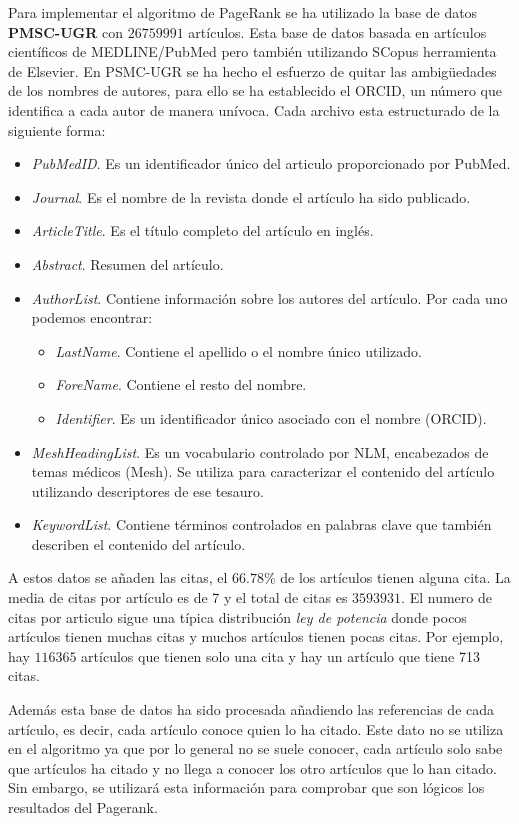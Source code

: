\documentclass[size=a4, parskip=half, titlepage=false, toc=flat, toc=bib, 12pt]{scrartcl}
\theoremstyle{theorem-style}
\theoremstyle{definition-style}
\theoremstyle{remark-style}
\theoremstyle{example-style}
\theoremstyle{definition-style}
\theoremstyle{remark-style}
\begin{document}
Para implementar el algoritmo de PageRank se ha utilizado la base de datos \textbf{PMSC-UGR} con
$26759991$ artículos. Esta base de datos basada en artículos científicos de MEDLINE/PubMed  pero
también utilizando SCopus herramienta de Elsevier. En PSMC-UGR se ha hecho el esfuerzo de
quitar las ambigüedades de los nombres de autores, para ello se ha establecido el ORCID, un número
que identifica a cada autor de manera unívoca. Cada archivo esta estructurado de la siguiente forma:
\begin{itemize}
\item \textit{PubMedID}. Es un identificador único del articulo proporcionado por PubMed.
\item \textit{Journal}. Es el nombre de la revista donde el artículo ha sido publicado.
\item \textit{ArticleTitle}. Es el título completo del artículo en inglés.
\item \textit{Abstract}. Resumen del artículo.
\item \textit{AuthorList}. Contiene información sobre los autores del artículo. Por cada uno podemos encontrar:
\begin{itemize}
\item \textit{LastName}. Contiene el apellido o el nombre único utilizado.
\item \textit{ForeName}. Contiene el resto del nombre.
\item \textit{Identifier}. Es un identificador único asociado con el nombre (ORCID).
\end{itemize}
\item \textit{MeshHeadingList}. Es un vocabulario controlado por NLM, encabezados de temas médicos (Mesh). Se utiliza para caracterizar el contenido del artículo utilizando descriptores de ese tesauro.
\item \textit{KeywordList}. Contiene términos controlados en palabras clave que también describen el contenido del artículo.
\end{itemize}

A estos datos se añaden las citas, el $66.78 \%$ de los artículos tienen alguna cita. La media de citas por artículo es de 7 y el total de citas es $3593931$. El numero de citas por articulo sigue una típica distribución \textit{ley de potencia} donde pocos artículos tienen muchas citas y muchos artículos tienen pocas citas. Por ejemplo, hay $116365$ artículos que tienen solo una cita y hay un artículo que tiene 713 citas.

Además esta base de datos ha sido procesada añadiendo las referencias de cada artículo, es decir, cada artículo conoce quien lo ha citado. Este dato no se utiliza en el algoritmo ya que por lo general no se suele conocer, cada artículo solo sabe que artículos ha citado y no llega a conocer los otro artículos que lo han citado. Sin embargo, se utilizará esta información para comprobar que son lógicos los resultados del Pagerank.
\end{document}
